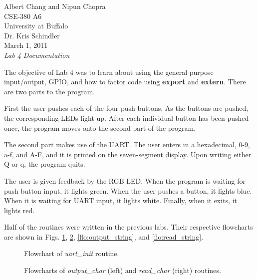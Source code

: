 \documentclass[letterpaper,10pt]{article}
\begin{document}
    Albert Chang and Nipun Chopra\\
    CSE-380 A6\\
    University at Buffalo\\
    Dr. Kris Schindler\\
    March 1, 2011\\
    \textit{Lab 4 Documentation}

    The objective of Lab 4 was to learn about using the general purpose
    input/output, GPIO, and how to factor code using \textbf{export} and
    \textbf{extern}. There are two parts to the program.

    First the user pushes each of the four push buttons. As the buttons are
    pushed, the corresponding LEDs light up. After each individual button has
    been pushed once, the program moves onto the second part of the program.

    The second part makes use of the UART. The user enters in a hexadecimal,
    0-9, a-f, and A-F, and it is printed on the seven-segment display. Upon
    writing either Q or q, the program quits.

    The user is given feedback by the RGB LED. When the program is waiting for
    push button input, it lights green. When the user pushes a button, it
    lights blue. When it is waiting for UART input, it lights white. Finally,
    when it exits, it lights red.

    Half of the routines were written in the previous labs. Their respective
    flowcharts are shown in Figs. \ref{flo:uart_init}, \ref{flo:chars},
    \ref{flo:output_string}, and \ref{flo:read_string}.

    \begin{figure}[p]
        
        \caption{Flowchart of \textit{uart\_init} routine.}
        \label{flo:uart_init}
    \end{figure}

    \begin{figure}[p]
        \begin{minipage}{0.5\linewidth}
            
        \end{minipage}%
        \begin{minipage}{0.5\linewidth}
            
        \end{minipage}
        \caption{Flowcharts of \textit{output\_char} (left) and \textit{read\_char} (right) routines.}
        \label{flo:chars}
    \end{figure}
\end{document}
